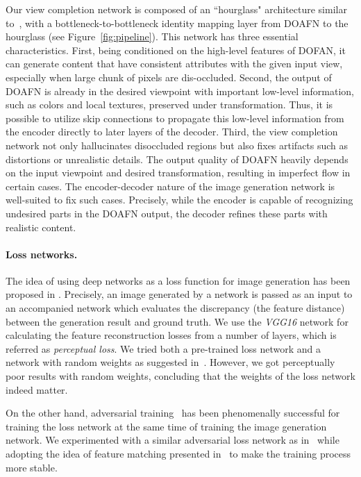 \documentclass[10pt,twocolumn,letterpaper]{article}
\begin{document}
Our view completion network is composed of an ``hourglass" architecture similar to~\cite{newell_eccv2016}, with a bottleneck-to-bottleneck identity mapping layer from DOAFN to the hourglass (see Figure~\ref{fig:pipeline}). This network has three essential characteristics. First, being conditioned on the high-level features of DOFAN, it can generate content that have consistent attributes with the given input view, especially when large chunk of pixels are dis-occluded. Second, the output of DOAFN is already in the desired viewpoint with important low-level information, such as colors and local textures, preserved under transformation. Thus, it is possible to utilize skip connections to propagate this low-level information from the encoder directly to later layers of the decoder. Third, the view completion network not only hallucinates disoccluded regions but also fixes artifacts such as distortions or unrealistic details. The output quality of DOAFN heavily depends on the input viewpoint and desired transformation, resulting in imperfect flow in certain cases. The encoder-decoder nature of the image generation network is well-suited to fix such cases. Precisely, while the encoder is capable of recognizing undesired parts in the DOAFN output, the decoder refines these parts with realistic content.


\vspace{-2mm}
\paragraph{Loss networks.}
\label{sec:lossnet}
The idea of using deep networks as a loss function for image generation has been proposed in \cite{larsen_icml2016,ulyanov_icml2016,johnson_eccv2016}. Precisely, an image generated by a network is passed as an input to an accompanied network which evaluates the discrepancy (the feature distance) between the generation result and ground truth. We use the \textit{VGG16} network for calculating the feature reconstruction losses from a number of layers, which is referred as \emph{perceptual loss}.
We tried both a pre-trained loss network and a network with random weights as suggested in~\cite{he_nips2016,Ustyuzhaninov_arxiv2016}. However, we got perceptually poor results with random weights, concluding that the weights of the loss network indeed matter. 

On the other hand, adversarial training~\cite{Goodfellow_nips2014} has been phenomenally successful for training the loss network at the same time of training the image generation network. We experimented with a similar adversarial loss network as in~\cite{Radford_iclr2016} while adopting the idea of feature matching presented in~\cite{salimans_nips2016} to make the training process more stable.
\end{document}
